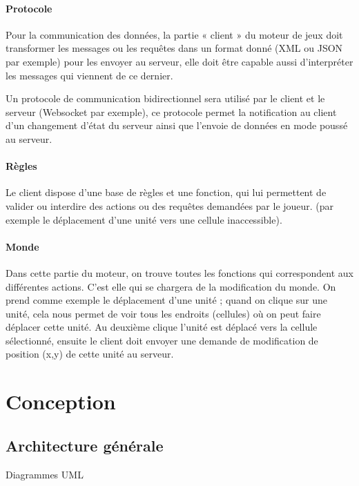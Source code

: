 \documentclass[a4paper,10pt]{report}
\begin{document}
      \subsubsection{Protocole}

	Pour la communication des données, la partie « client » du moteur de jeux doit transformer les messages ou les requêtes dans un format donné (XML ou JSON par exemple) pour les envoyer au serveur, elle doit être capable aussi d’interpréter les messages qui viennent de ce dernier.

	Un protocole de communication bidirectionnel sera utilisé par le client et le serveur (Websocket par exemple), ce protocole permet la notification au client d’un changement d’état du serveur ainsi que l’envoie de données en mode poussé au serveur.

      \subsubsection{Règles}

	Le client dispose d’une base de règles et une fonction, qui lui permettent de valider ou interdire des actions ou des requêtes demandées par le joueur. (par exemple le déplacement d’une unité vers une cellule inaccessible).

      \subsubsection{Monde}

	Dans cette partie du moteur, on trouve toutes les fonctions qui correspondent aux différentes actions. C'est elle qui se chargera de la modification du monde. On prend comme exemple le déplacement d’une unité ; quand on clique sur une unité, cela nous permet de voir tous les endroits (cellules) où on peut faire déplacer cette unité. Au deuxième clique l’unité est déplacé vers la cellule sélectionné, ensuite le client doit envoyer une demande de modification de position (x,y) de cette unité au serveur.

  \chapter{Conception}

    \section{Architecture générale}

      Diagrammes UML
\end{document}
